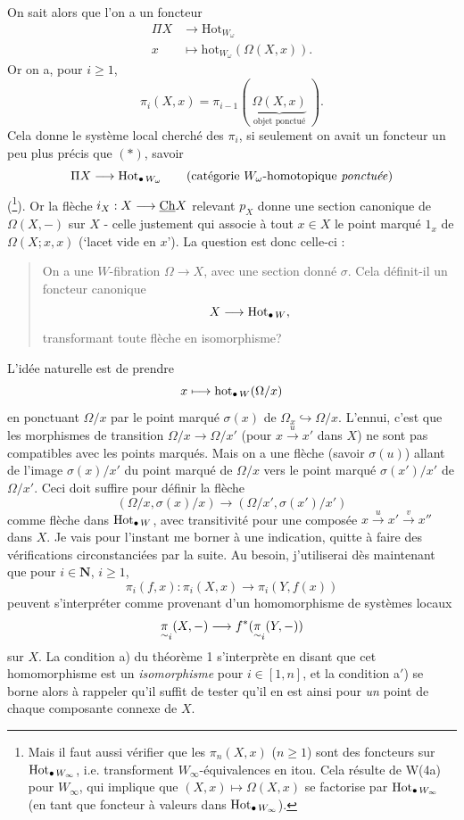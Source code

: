 \clearpage


On sait alors que l'on a un foncteur
\[
\begin{aligned}
\Pi X &\longrightarrow \mathrm{Hot}_{W_\omega}\\
x &\longmapsto \mathrm{hot}_{W_\omega}(\Omega(X,x)).
\end{aligned}
\tag*{$(*)$}
\]
Or on a, pour $i \geq 1$,
\[
\pi_i(X,x) = \pi_{i-1}(\ \underbrace{\Omega(X,x)}_{\text{objet ponctué}}\ ).
\]
Cela donne le système local cherché des $\pi_i$, si seulement on avait un foncteur un peu plus précis que $(*)$, savoir
\[
\Pi X \longrightarrow \mathrm{Hot}_{\bullet\,W_\omega} \qquad \text{(catégorie $W_\omega$-homotopique \textit{ponctuée})}
\]
(\footnote[114]{Mais il faut aussi vérifier que les $\pi_n(X,x)$ ($n \geq 1$) sont des foncteurs sur $\mathrm{Hot}_{\bullet\,W_\infty}$, i.e. transforment $W_\infty$-équivalences en itou. Cela résulte de W(4a) pour $W_\infty$, qui implique que $(X,x) \mapsto \Omega(X,x)$ se factorise par $\mathrm{Hot}_{\bullet\,W_\infty}$ (en tant que foncteur à valeurs dans $\mathrm{Hot}_{\bullet\,W_\infty}$).}). Or la flèche $i_X : X \longrightarrow \underline{\mathrm{Ch}} X$ relevant $p_X$ donne une section canonique de $\Omega(X,-)$ sur $X$ -
celle justement qui associe à tout $x \in X$ le point marqué $1_x$ de $\Omega(X;x,x)$ (`lacet vide en $x$'). La question est donc celle-ci :

\begin{quote}
On a une $W$-fibration $\Omega \longrightarrow X$, avec une section donné $\sigma$. Cela définit-il un foncteur canonique %
\[
X \longrightarrow \mathrm{Hot}_{\bullet\,W},
\]
transformant toute flèche en isomorphisme?
\end{quote}

L'idée naturelle est de prendre
\[
x \longmapsto \mathrm{hot}_{\bullet\,W}(\Omega/x)
\]
en ponctuant $\Omega/x$ par le point marqué $\sigma(x)$ de $\Omega_x \hookrightarrow \Omega/x$. L'ennui, c'est que les morphismes de transition $\Omega/x \longrightarrow \Omega/x'$ (pour $x \xrightarrow{u} x'$ dans $X$) ne sont pas compatibles avec les points marqués. Mais on a une flèche (savoir $\sigma(u)$) allant
de l'image $\sigma(x)/x'$ du point marqué de $\Omega/x$ vers le point marqué $\sigma(x')/x'$ de $\Omega/x'$. Ceci doit suffire pour définir la flèche
\[
(\Omega/x,\sigma(x)/x) \longrightarrow (\Omega/x',\sigma(x')/x')
\]
comme flèche dans $\mathrm{Hot}_{\bullet\,W}$, avec transitivité pour une composée $x \xrightarrow{u} x' \xrightarrow{v} x''$ dans $X$. Je vais pour l'instant me borner
à une indication, quitte à faire des vérifications circonstanciées par la suite. Au besoin, j'utiliserai dès maintenant que pour $i \in \mathbf{N}$, $i \geq 1$,
\[
\pi_i(f,x) : \pi_i(X,x) \longrightarrow \pi_i(Y,f(x))
\]
peuvent s'interpréter comme provenant d'un homomorphisme de systèmes locaux
\[
\underset{\sim}{\pi}_i(X,-) \longrightarrow f^*(\underset{\sim}{\pi}_i(Y,-))
\]
sur $X$. La condition a) du théorème 1 s'interprète en disant que cet homomorphisme est un \textit{isomorphisme} pour $i \in [1,n]$, et la condition a$'$) se borne alors à rappeler qu'il suffit de tester qu'il en est ainsi pour \textit{un} point de chaque composante connexe de $X$.

